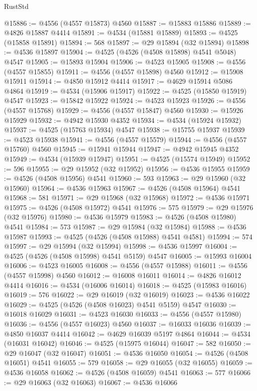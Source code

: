 \begin{lexlean}{RustStd}
\begin{coremodule}
{\begin{coremodule}
{{{{{{{{{{{{{{{{{{{{{{{{{{{{{{{{{{{{{{{{{{{{{{{{{{{{{{{@15886 := @4556 (@4557 @15873) @4560
@15887 := @15883 @15886
@15889 := @4826 @15887 @4414
@15891 := @4534 (@15881 @15889)
@15893 := @4525 (@15858 @15891)
@15894 := 568
@15897 := @29 @15894 (@32 @15894)
@15898 := @4536 @15897
@15904 := @4525 (@4526 (@4508 @15898) @4541 @5048) @4547
@15905 := @15893 @15904
@15906 := @4523 @15905
@15908 := @4556 (@4557 @15855)
@15911 := @4556 (@4557 @15898) @4560
@15912 := @15908 @15911
@15914 := @4850 @15912 @4414
@15917 := @4629 @15914 @5086 @4864
@15919 := @4534 (@15906 @15917)
@15922 := @4525 (@15850 @15919) @4547
@15923 := @15842 @15922
@15924 := @4523 @15923
@15926 := @4556 (@4557 @15768)
@15929 := @4556 (@4557 @15847) @4560
@15930 := @15926 @15929
@15932 := @4942 @15930 @4352
@15934 := @4534 (@15924 @15932)
@15937 := @4525 (@15763 @15934) @4547
@15938 := @15755 @15937
@15939 := @4523 @15938
@15941 := @4556 (@4557 @15579)
@15944 := @4556 (@4557 @15760) @4560
@15945 := @15941 @15944
@15947 := @4942 @15945 @4352
@15949 := @4534 (@15939 @15947)
@15951 := @4525 (@15574 @15949)
@15952 := 596
@15955 := @29 @15952 (@32 @15952)
@15956 := @4536 @15955
@15959 := @4526 (@4508 @15956) @4541
@15960 := 593
@15963 := @29 @15960 (@32 @15960)
@15964 := @4536 @15963
@15967 := @4526 (@4508 @15964) @4541
@15968 := 581
@15971 := @29 @15968 (@32 @15968)
@15972 := @4536 @15971
@15975 := @4526 (@4508 @15972) @4541
@15976 := 575
@15979 := @29 @15976 (@32 @15976)
@15980 := @4536 @15979
@15983 := @4526 (@4508 @15980) @4541
@15984 := 573
@15987 := @29 @15984 (@32 @15984)
@15988 := @4536 @15987
@15993 := @4525 (@4526 (@4508 @15988) @4541 @4581)
@15994 := 574
@15997 := @29 @15994 (@32 @15994)
@15998 := @4536 @15997
@16004 := @4525 (@4526 (@4508 @15998) @4541 @5159) @4547
@16005 := @15993 @16004
@16006 := @4523 @16005
@16008 := @4556 (@4557 @15988)
@16011 := @4556 (@4557 @15998) @4560
@16012 := @16008 @16011
@16014 := @4826 @16012 @4414
@16016 := @4534 (@16006 @16014)
@16018 := @4525 (@15983 @16016)
@16019 := 576
@16022 := @29 @16019 (@32 @16019)
@16023 := @4536 @16022
@16029 := @4525 (@4526 (@4508 @16023) @4541 @5159) @4547
@16030 := @16018 @16029
@16031 := @4523 @16030
@16033 := @4556 (@4557 @15980)
@16036 := @4556 (@4557 @16023) @4560
@16037 := @16033 @16036
@16039 := @4850 @16037 @4414
@16042 := @4629 @16039 @5197 @4864
@16044 := @4534 (@16031 @16042)
@16046 := @4525 (@15975 @16044)
@16047 := 582
@16050 := @29 @16047 (@32 @16047)
@16051 := @4536 @16050
@16054 := @4526 (@4508 @16051) @4541
@16055 := 579
@16058 := @29 @16055 (@32 @16055)
@16059 := @4536 @16058
@16062 := @4526 (@4508 @16059) @4541
@16063 := 577
@16066 := @29 @16063 (@32 @16063)
@16067 := @4536 @16066
}}}}}}}}}}}}}}}}}}}}}}}}}}}}}}}}}}}}}}}}}}}}}}}}}}}}}}}
\end{coremodule}}
\end{coremodule}
\end{lexlean}
